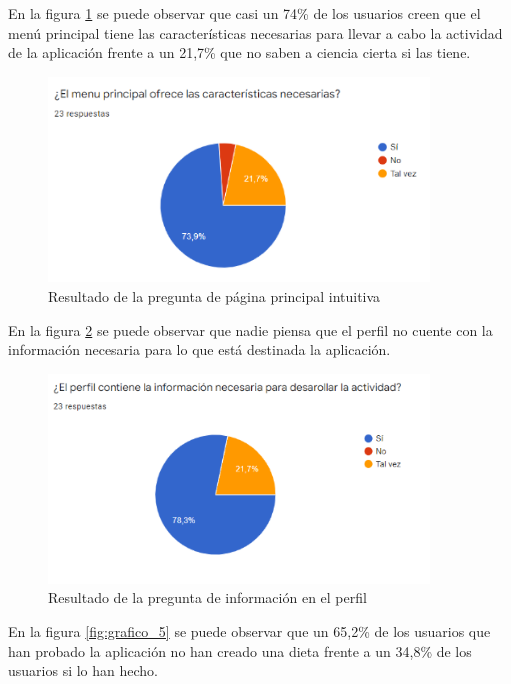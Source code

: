 
En la figura \ref{fig:grafico_3} se puede observar que casi un 74\% de los usuarios creen que el menú principal tiene las características necesarias para llevar a cabo la actividad de la aplicación frente a un 21,7\% que no saben a ciencia cierta si las tiene.

\begin{figure}[H]
    \centering
    \includegraphics[width=0.9\textwidth]{Images/Capitulo8/Capitulo8.2/grafico3.png}
    \caption{Resultado de la pregunta de página principal intuitiva}
    \label{fig:grafico_3}
\end{figure}

En la figura \ref{fig:grafico_4} se puede observar que nadie piensa que el perfil no cuente con la información necesaria para lo que está destinada la aplicación.

\begin{figure}[H]
    \centering
    \includegraphics[width=0.9\textwidth]{Images/Capitulo8/Capitulo8.2/grafico4.png}
    \caption{Resultado de la pregunta de información en el perfil}
    \label{fig:grafico_4}
\end{figure}

En la figura \ref{fig:grafico_5} se puede observar que un 65,2\% de los usuarios que han probado la aplicación no han creado una dieta frente a un 34,8\% de los usuarios si lo han hecho.

